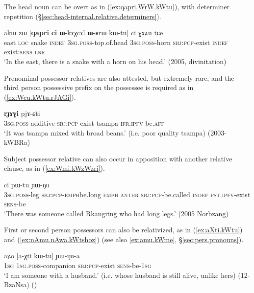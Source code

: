 The head noun can be overt  as in (\ref{ex:qapri.WrW.kWtu}), with determiner repetition (§\ref{sec:head-internal.relative.determiners}).


\begin{exe}
\ex \label{ex:qapri.WrW.kWtu}
\gll  akɯ zɯ [\textbf{qapri} \textbf{ci} \textbf{ɯ}-kɤχcɤl \textbf{ɯ}-ʁrɯ kɯ-tu] ci ɣɤʑu tɕe \\
east \textsc{loc} snake \textsc{indef} \textsc{3sg}.\textsc{poss}-top.of.head \textsc{3sg}.\textsc{poss}-horn \textsc{sbj}:\textsc{pcp}-exist \textsc{indef} exist:\textsc{sens} \textsc{lnk} \\
\glt `In the east, there is a snake with a horn on his head.' (2005, divinitation)
\end{exe}

 
Prenominal possessor relatives are also attested, but extremely rare, and the third person possessive prefix on the possessee is required as in (\ref{ex:Wcu.kWtu.rJAGi}).

\begin{exe}
\ex \label{ex:Wcu.kWtu.rJAGi}
\gll  [\textbf{ɯ}-cu kɯ-tu] \textbf{rɟɤɣi} pjɤ-ɕti \\
\textsc{3sg}.\textsc{poss}-additive \textsc{sbj}:\textsc{pcp}-exist tsampa \textsc{ifr}.\textsc{ipfv}-be.\textsc{aff} \\
\glt `It was tsampa mixed with broad beans.' (i.e. poor quality tsampa) (2003-kWBRa)
 \end{exe}

Subject possessor relative can also occur in apposition with another relative clause, as in (\ref{ex:Wmi.kWzWzri}).

\begin{exe}
 \ex \label{ex:Wmi.kWzWzri}
  ci pɯ-tu ɲɯ-ŋu \\
 \textsc{3sg}.\textsc{poss}-leg \textsc{sbj}:\textsc{pcp}-\textsc{emph}\redp{}be.long \textsc{emph}  \textsc{anthr} \textsc{sbj}:\textsc{pcp}-be.called \textsc{indef} \textsc{pst}.\textsc{ipfv}-exist \textsc{sens}-be \\
 \glt `There was someone called Rkangring who had long legs.' (2005 Norbzang)
 \end{exe}

First or second person possessors can also be relativized, as in (\ref{ex:aXti.kWtu}) and (\ref{ex:nAmu.nAwa.kWtshoz}) (see also \ref{ex:amu.kWme}, §\ref{sec:pers.pronouns}).

\begin{exe}
\ex \label{ex:aXti.kWtu}
\gll aʑo [a-χti kɯ-tu] ɲɯ-ŋu-a \\
\textsc{1sg} \textsc{1sg}.\textsc{poss}-companion \textsc{sbj}:\textsc{pcp}-exist \textsc{sens}-be-\textsc{1sg} \\
\glt `I am someone with a husband.' (i.e. whose husband is still alive, unlike hers) (12-BzaNsa)
()
\end{exe}

